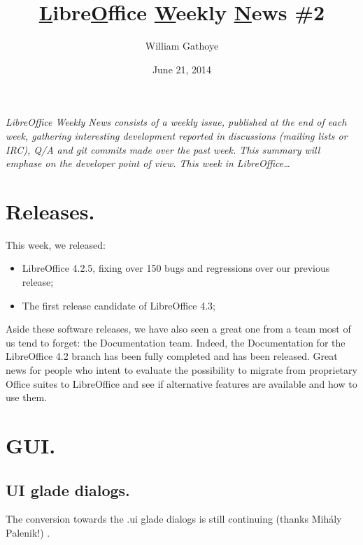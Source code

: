 \documentclass{article}
\begin{document}
\title{\underline{L}ibre\underline{O}ffice \underline{W}eekly \underline{N}ews \#2}
\author{William Gathoye}
\date{June 21, 2014}
\maketitle


\emph{LibreOffice Weekly News consists of a weekly issue, published at the end of
each week, gathering interesting development reported in discussions (mailing
lists or IRC), Q/A and git commits made over the past week. This summary will
emphase on the developer point of view.
This week in LibreOffice\ldots}

\tableofcontents



\section{Releases.}

This week, we released:

\begin{itemize}
    \item LibreOffice 4.2.5, fixing over 150 bugs and regressions over our previous release\cite{libo425};
    \item The first release candidate of LibreOffice 4.3\cite{libo43rc1};
\end{itemize}

Aside these software releases, we have also seen a great one from a team most of us tend to forget: the Documentation team. Indeed, the Documentation for the LibreOffice 4.2 branch has been fully completed and has been released\cite{doc42}. Great news for people who intent to evaluate the possibility to migrate from proprietary Office suites to LibreOffice and see if alternative features are available and how to use them.



\section{GUI.}

\subsection{UI glade dialogs.}

The conversion towards the .ui glade dialogs is still continuing (thanks Mihály Palenik!) \cite{gladeUi1,gladeUi2,gladeUi3,gladeUi4}.
\end{document}
